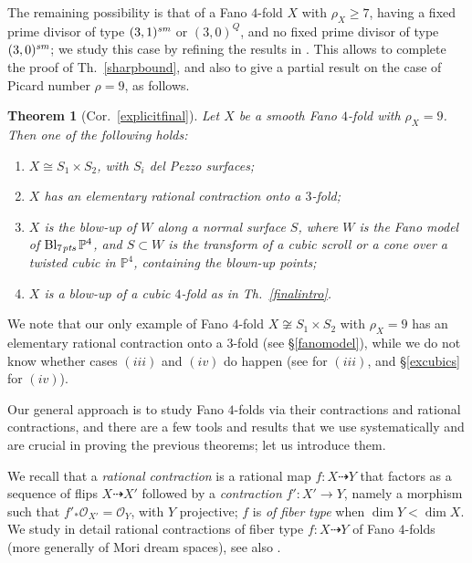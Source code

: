 \documentclass[a4paper,12pt]{amsart}
\newtheorem{thm}{Theorem}[section]
\theoremstyle{definition}
\numberwithin{figure}{section}
\numberwithin{table}{section}
\newcommand{\ol}{\mathcal{O}}
\newcommand{\pr}{\mathbb{P}}
\newcommand{\Bl}{\operatorname{Bl}}
\newcommand{\sm}{\text{\it sm}}
\newcommand{\pts}{\text{\it pts}}
\begin{document}
\medskip

The remaining possibility is that of a  Fano $4$-fold $X$ with $\rho_X\geq 7$, having a fixed prime divisor of type $(3,1)^{\sm}$ or $(3,0)^Q$, and no fixed prime divisor of type $(3,0)^{\sm}$; we study this case
by refining the results in \cite{small}. This allows to complete the proof of Th.~\ref{sharpbound}, and also
to give a partial result on the case of  Picard number $\rho=9$, as follows.
\begin{thm}[Cor.~\ref{explicitfinal}]\label{explicit}
  Let $X$ be a smooth Fano $4$-fold with $\rho_X= 9$.
Then one of the following holds:
\begin{enumerate}[$(i)$]
\item $X\cong S_1\times S_2$, with $S_i$ del Pezzo surfaces;
\item $X$ has an elementary rational contraction onto a $3$-fold;
\item  $X$ is the blow-up of $W$ along a normal surface $S$,
  where $W$ is the Fano model of $\Bl_{7\mskip1mu\pts}\pr^4$, and $S\subset W$ is the transform of a cubic scroll or
  a cone over a twisted cubic in
$\pr^4$, containing the blown-up points;
\item  $X$ is a blow-up of a cubic $4$-fold as in Th.~\ref{finalintro}.
     \end{enumerate}
   \end{thm}
   We note that our only example of Fano $4$-fold $X\not\cong S_1\times S_2$ with $\rho_X=9$ has an  elementary rational contraction onto a $3$-fold (see \S\ref{fanomodel}), while we do not know whether cases $(iii)$ and $(iv)$ do happen (see \cite[\S 7.2]{3folds} for $(iii)$, and \S\ref{excubics} for $(iv)$).

   \medskip
   
 Our general approach is to study Fano $4$-folds via their contractions and rational contractions, and
 there are a few tools and results that we use systematically and
 are crucial in proving the previous theorems; let us introduce them.

\medskip

 We recall that a \emph{rational contraction} is a rational map $f\colon X\dasharrow Y$ that factors as a sequence of flips $X\dasharrow X'$ followed by a \emph{contraction}  $f'\colon X'\to Y$, namely a morphism such that $f'_*\ol_{X'}=\ol_Y$, with $Y$ projective; $f$ is \emph{of fiber type} when $\dim Y<\dim X$.
We study in detail rational contractions of fiber type $f\colon X\dasharrow Y$ of Fano $4$-folds (more generally of Mori dream spaces),
see also \cite{fanos, fibrations}.
\end{document}
